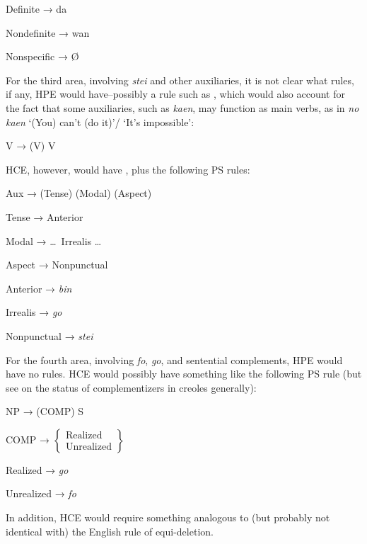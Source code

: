 \ea\label{ex:94}
{\rm Definite}  → da
\z

\ea\label{ex:95}
{\rm Nondefinite} → wan
\z

\ea\label{ex:96}
{\rm Nonspecific} → \O
\z


For the third area, involving \textit{stei} and other auxiliaries, it is not clear what rules, if any, HPE would have--possibly a rule such as , which would also account for the fact that some auxiliaries, such as \textit{kaen}, may function as main verbs, as in \textit{no kaen} `(You) can't (do it)'/ `It's impossible':

\ea\label{ex:97}
V → (V) V
\z

\noindent HCE, however, would have , plus the following PS rules:

\ea\label{ex:98}
 Aux → (Tense) (Modal) (Aspect)
\z

\ea\label{ex:99}
 Tense → Anterior
\z

\ea\label{ex:100}
 Modal → \ldots~Irrealis \ldots
\z

\ea\label{ex:101}
 Aspect → Nonpunctual
\z

\ea\label{ex:102}
 {\rm Anterior} → \textit{bin}
\z

\ea\label{ex:103}
 {\rm Irrealis} → \textit{go}
\z

\ea\label{ex:104}
 {\rm Nonpunctual} → \textit{stei}
\z


For the fourth area, involving \textit{fo}, \textit{go}, and sentential comple\-ments, HPE would have no rules. HCE would possibly have something like the following PS rule (but see  on the status of complementizers in creoles generally):

\ea\label{ex:105}
NP → (COMP) S 
\z

\ea\label{ex:106}
 COMP → $\left\{\begin{array}{l}\text{Realized}\\\text{Unrealized}\end{array}\right\}$
\z

\ea\label{ex:107}
 {\rm Realized} → \textit{go}
\z

\ea\label{ex:108}
{\rm Unrealized} → \textit{fo}
\z

\noindent In addition, HCE would require something analogous to (but probably not identical with) the English rule of equi-deletion.

